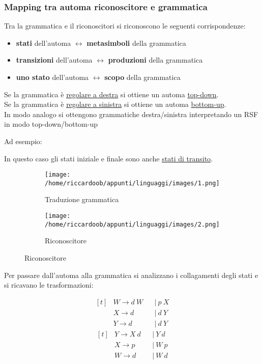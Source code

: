 \subsubsection{Mapping tra automa riconoscitore e grammatica}
Tra la grammatica e il riconoscitori si riconoscono le seguenti corrispondenze:
\begin{itemize}
    \item \textbf{stati} dell'automa $\longleftrightarrow$ \textbf{metasimboli} della grammatica
    \item \textbf{transizioni} dell'automa $\longleftrightarrow$ \textbf{produzioni} della grammatica
    \item \textbf{uno stato} dell'automa $\longleftrightarrow$ \textbf{scopo} della grammatica
\end{itemize}
Se la grammatica è \underline{regolare a destra} si ottiene un automa \underline{top-down}.\\
Se la grammatica è \underline{regolare a sinistra} si ottiene un automa \underline{bottom-up}.\\
In modo analogo si ottengono grammatiche destra/sinistra interpretando un RSF in modo top-down/bottom-up

\noindent
Ad esempio:

In questo caso gli stati iniziale e finale sono anche \underline{stati di transito}.
\begin{figure}[H]
    \begin{subfigure}{0.5\textwidth}
        \caption{Traduzione grammatica}
        \centering
        \texttt{[image: /home/riccardoob/appunti/linguaggi/images/1.png]}
    \end{subfigure}%
    \begin{subfigure}{0.5\textwidth}
        \caption{Riconoscitore}
        \centering
        \texttt{[image: /home/riccardoob/appunti/linguaggi/images/2.png]}
    \end{subfigure}
\end{figure}

Per passare dall'automa alla grammatica si analizzano i collagamenti degli stati e si ricavano le trasformazioni:
\\
\begin{multicols}{2}
    \noindent
    \begin{equation*}
        \begin{aligned}[t]
        &W \rightarrow d\ W &&|\ p\ X\\
        &X \rightarrow d\ &&|\ d\ Y\\
        &Y \rightarrow d\ &&|\ d\ Y
        \end{aligned}
    \end{equation*}
    \begin{equation*}
        \begin{aligned}[t]
        &Y \rightarrow X\ d &&|\ Y\ d\\
        &X \rightarrow p\ &&|\ W\ p\\
        &W \rightarrow d\ &&|\ W\ d
        \end{aligned}
    \end{equation*}    
\end{multicols}

